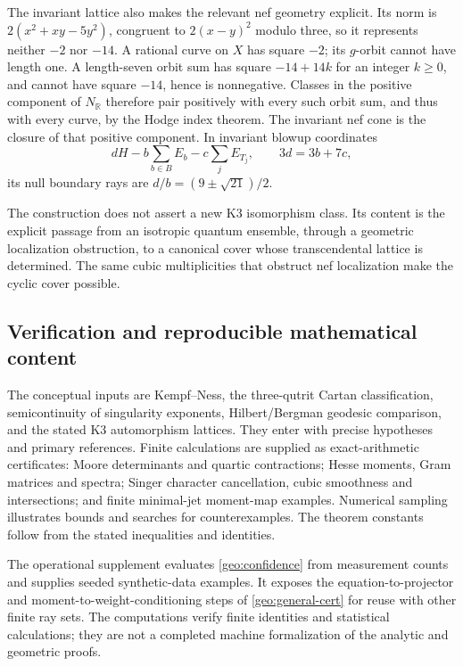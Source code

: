 The invariant lattice also makes the relevant nef geometry explicit.
Its norm is \(2(x^2+xy-5y^2)\), congruent to \(2(x-y)^2\) modulo three,
so it represents neither \(-2\) nor \(-14\).
A rational curve on \(X\) has square \(-2\); its \(g\)-orbit cannot
have length one. A length-seven orbit sum has square \(-14+14k\)
for an integer \(k\ge0\), and cannot have square \(-14\), hence is
nonnegative. Classes in the positive component of \(N_{\mathbb R}\)
therefore pair positively with every such orbit sum, and thus with
every curve, by the Hodge index theorem. The invariant nef cone is
the closure of that positive component. In invariant blowup
coordinates
\[
 dH-b\sum_{b\in B}E_b-c\sum_jE_{T_j},\qquad
 3d=3b+7c,
\]
its null boundary rays are \(d/b=(9\pm\sqrt{21})/2\).

The construction does not assert a new K3 isomorphism class. Its
content is the explicit passage from an isotropic quantum ensemble,
through a geometric localization obstruction, to a canonical cover
whose transcendental lattice is determined. The same cubic
multiplicities that obstruct nef localization make the cyclic cover
possible.

\subsection{Verification and reproducible mathematical content}
\label{geo:verification}

The conceptual inputs are Kempf--Ness, the three-qutrit Cartan
classification, semicontinuity of singularity exponents,
Hilbert/Bergman geodesic comparison, and the stated K3 automorphism
lattices. They enter with precise hypotheses and primary references.
Finite calculations are supplied as exact-arithmetic certificates:
Moore determinants and quartic contractions; Hesse moments, Gram
matrices and spectra; Singer character cancellation, cubic
smoothness and intersections; and finite minimal-jet moment-map
examples. Numerical sampling illustrates bounds and searches for
counterexamples. The theorem constants follow from the stated
inequalities and identities.

The operational supplement evaluates \eqref{geo:confidence} from
measurement counts and supplies seeded synthetic-data examples.
It exposes the equation-to-projector and moment-to-weight-conditioning
steps of \eqref{geo:general-cert} for reuse with other finite ray
sets. The computations verify finite identities and statistical
calculations; they are not a completed machine formalization of
the analytic and geometric proofs.
